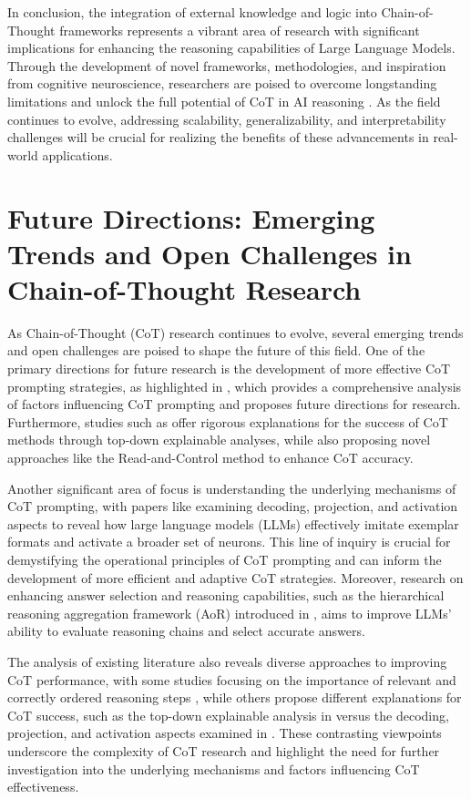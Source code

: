 \documentclass[conference]{IEEEtran}
\begin{document}
In conclusion, the integration of external knowledge and logic into Chain-of-Thought frameworks represents a vibrant area of research with significant implications for enhancing the reasoning capabilities of Large Language Models. Through the development of novel frameworks, methodologies, and inspiration from cognitive neuroscience, researchers are poised to overcome longstanding limitations and unlock the full potential of CoT in AI reasoning \cite{b16}. As the field continues to evolve, addressing scalability, generalizability, and interpretability challenges will be crucial for realizing the benefits of these advancements in real-world applications.

\section{Future Directions: Emerging Trends and Open Challenges in Chain-of-Thought Research}
As Chain-of-Thought (CoT) research continues to evolve, several emerging trends and open challenges are poised to shape the future of this field. One of the primary directions for future research is the development of more effective CoT prompting strategies, as highlighted in \cite{b1}, which provides a comprehensive analysis of factors influencing CoT prompting and proposes future directions for research. Furthermore, studies such as \cite{b2} offer rigorous explanations for the success of CoT methods through top-down explainable analyses, while also proposing novel approaches like the Read-and-Control method to enhance CoT accuracy.

Another significant area of focus is understanding the underlying mechanisms of CoT prompting, with papers like \cite{b3} examining decoding, projection, and activation aspects to reveal how large language models (LLMs) effectively imitate exemplar formats and activate a broader set of neurons. This line of inquiry is crucial for demystifying the operational principles of CoT prompting and can inform the development of more efficient and adaptive CoT strategies. Moreover, research on enhancing answer selection and reasoning capabilities, such as the hierarchical reasoning aggregation framework (AoR) introduced in \cite{b4}, aims to improve LLMs' ability to evaluate reasoning chains and select accurate answers.

The analysis of existing literature also reveals diverse approaches to improving CoT performance, with some studies focusing on the importance of relevant and correctly ordered reasoning steps \cite{b5}, while others propose different explanations for CoT success, such as the top-down explainable analysis in \cite{b2} versus the decoding, projection, and activation aspects examined in \cite{b3}. These contrasting viewpoints underscore the complexity of CoT research and highlight the need for further investigation into the underlying mechanisms and factors influencing CoT effectiveness.
\end{document}
